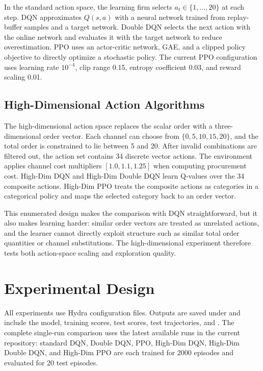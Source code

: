 \documentclass[nohyperref]{article}
\begin{document}
In the standard action space, the learning firm selects $a_t\in\{1,\ldots,20\}$ at each step. DQN approximates $Q(s,a)$ with a neural network trained from replay-buffer samples and a target network. Double DQN selects the next action with the online network and evaluates it with the target network to reduce overestimation. PPO uses an actor-critic network, GAE, and a clipped policy objective to directly optimize a stochastic policy. The current PPO configuration uses learning rate $10^{-4}$, clip range 0.15, entropy coefficient 0.03, and reward scaling 0.01.

\subsection{High-Dimensional Action Algorithms}

The high-dimensional action space replaces the scalar order with a three-dimensional order vector. Each channel can choose from $\{0,5,10,15,20\}$, and the total order is constrained to lie between 5 and 20. After invalid combinations are filtered out, the action set contains 34 discrete vector actions. The environment applies channel cost multipliers $[1.0,1.1,1.25]$ when computing procurement cost. High-Dim DQN and High-Dim Double DQN learn Q-values over the 34 composite actions. High-Dim PPO treats the composite actions as categories in a categorical policy and maps the selected category back to an order vector.

This enumerated design makes the comparison with DQN straightforward, but it also makes learning harder: similar order vectors are treated as unrelated actions, and the learner cannot directly exploit structure such as similar total order quantities or channel substitutions. The high-dimensional experiment therefore tests both action-space scaling and exploration quality.

\section{Experimental Design}

All experiments use Hydra configuration files. Outputs are saved under  and include the model, training scores, test scores, test trajectories, and . The complete single-run comparison uses the latest available runs in the current repository: standard DQN, Double DQN, PPO, High-Dim DQN, High-Dim Double DQN, and High-Dim PPO are each trained for 2000 episodes and evaluated for 20 test episodes.
\end{document}
